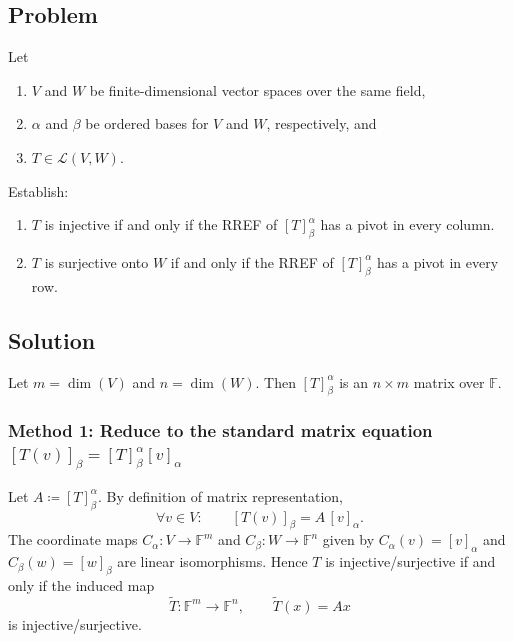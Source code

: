 \documentclass[12pt]{article}
\newcommand{\F}{\mathbb{F}}
\newcommand{\cL}{\mathcal{L}}
\begin{document}
\subsection{Problem}
Let
\begin{enumerate}[label=(\roman*)]
\item $V$ and $W$ be finite-dimensional vector spaces over the same field,
\item $\alpha$ and $\beta$ be ordered bases for $V$ and $W$, respectively, and
\item $T\in\cL(V,W)$.
\end{enumerate}
Establish:
\begin{enumerate}[label=(\arabic*)]
\item $T$ is injective if and only if the RREF of $[T]_{\beta}^{\alpha}$ has a pivot in every column.
\item $T$ is surjective onto $W$ if and only if the RREF of $[T]_{\beta}^{\alpha}$ has a pivot in every row.
\end{enumerate}

\subsection{Solution}
Let $m=\dim(V)$ and $n=\dim(W)$. Then $[T]_{\beta}^{\alpha}$ is an $n\times m$ matrix over $\F$.

\subsubsection{Method 1: Reduce to the standard matrix equation $[T(v)]_\beta=[T]_\beta^\alpha [v]_\alpha$}
Let $A\coloneqq [T]_{\beta}^{\alpha}$. By definition of matrix representation,
\[
\forall v\in V:\qquad [T(v)]_{\beta}=A\,[v]_{\alpha}.
\]
The coordinate maps $C_\alpha:V\to \F^m$ and $C_\beta:W\to \F^n$ given by
$C_\alpha(v)=[v]_\alpha$ and $C_\beta(w)=[w]_\beta$ are linear isomorphisms.
Hence $T$ is injective/surjective if and only if the induced map
\[
\widetilde{T}:\F^m\to\F^n,\qquad \widetilde{T}(x)=Ax
\]
is injective/surjective.
\end{document}
